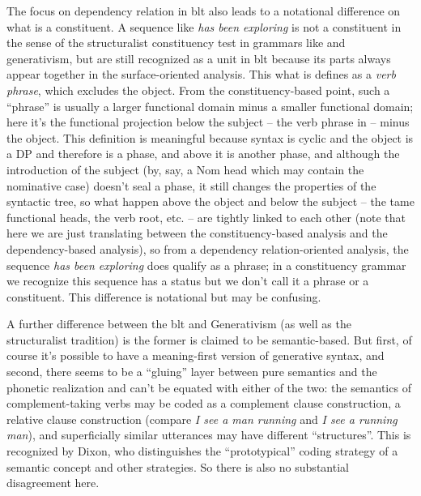 \documentclass[UTF8, a4paper, oneside, scheme=plain]{ctexrep}
\newcommand*{\citepage}[1]{p.~{#1}}
\newcommand*{\term}[1]{\emph{#1}}
\newcommand{\corpus}[1]{\emph{#1}}
\begin{document}
The focus on dependency relation in \acs{blt} also leads to 
a notational difference on what is a constituent.
A sequence like \corpus{has been exploring} is not a constituent in the sense of 
the structuralist constituency test in grammars like \citet{cgel} and generativism,
but are still recognized as a unit in \acs{blt} 
because its parts always appear together in the surface-oriented analysis.
This what is \citet[\citepage{109}]{dixon2009basic} defines 
as a \term{verb phrase},
which excludes the object. 
From the constituency-based point, 
such a ``phrase'' is usually a larger functional domain minus a smaller functional domain;
here it's the functional projection below the subject -- the verb phrase in \citet{cgel} --
minus the object.
This definition is meaningful 
because syntax is cyclic 
and the object is a DP and therefore is a phase, 
and above it is another phase, 
and although the introduction of the subject 
(by, say, a Nom head which may contain the nominative case) 
doesn't seal a phase, 
it still changes the properties of the syntactic tree, 
so what happen above the object and below the subject 
-- the \acs{tame} functional heads, the verb root, etc. -- 
are tightly linked to each other
(note that here we are just translating between 
the constituency-based analysis and the dependency-based analysis), 
so from a dependency relation-oriented analysis, 
the sequence \corpus{has been exploring} does qualify as a phrase; 
in a constituency grammar 
we recognize this sequence has a status 
but we don't call it a phrase or a constituent.
This difference is notational but may be confusing.

A further difference between the \acl{blt} and Generativism (as well as the structuralist tradition)
is the former is claimed to be semantic-based.
But first, of course it's possible to have a meaning-first version of generative syntax,
and second,
there seems to be a ``gluing'' layer between pure semantics and 
the phonetic realization 
and can't be equated with either of the two: 
the semantics of complement-taking verbs 
may be coded as a complement clause construction, 
a relative clause construction 
(compare \corpus{I see a man running} and \corpus{I see a running man}),
and superficially similar utterances may have different ``structures''.
This is recognized by Dixon, 
who distinguishes the ``prototypical'' coding strategy of a semantic concept 
and other strategies.
So there is also no substantial disagreement here.
\end{document}
